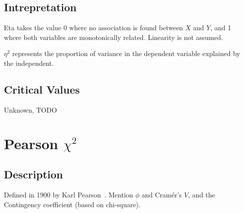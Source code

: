 \documentclass[11pt]{article}
\begin{document}
\subsection{Intrepretation}
Eta takes the value 0 where no association is found between $X$ and $Y$, and 1 where both variables are monotonically related.  Linearity is not assumed.

$\eta^2$ represents the proportion of variance in the dependent variable explained by the independent.

\subsection{Critical Values}
Unknown, TODO









\section{Pearson $\chi^2$}
\label{section:pearsonchisq}
\subsection{Description}
Defined in 1900 by Karl Pearson~\cite{pearson1900x}.
Mention $\phi$ and Cram\'er's $V$, and the Contingency coefficient (based on chi-square).

\end{document}
